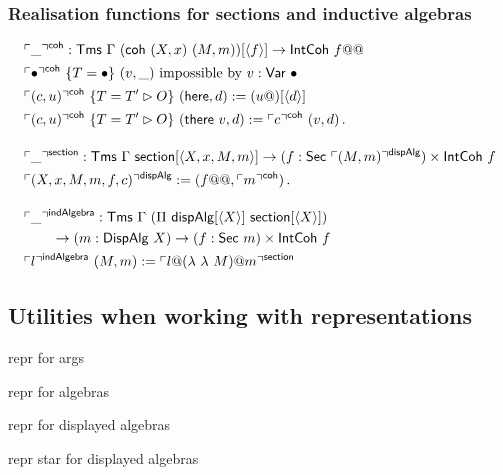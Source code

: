 \subsubsection{Realisation functions for sections and inductive algebras}

\begin{align*}
&\emb{\_}^{\mta{coh}} : \Tms\ \Gamma \ (\mta{coh}\ (X, x)\ (M, m))[\Msub f] \to \mta{IntCoh}\ f@@ \\
&\emb{\bullet}^{\mta{coh}}\ \{T = \bullet\}\ (v, \_)\text{ impossible by $v : \mta{Var}\ \bullet$} \\
&\emb{(c, u)}^{\mta{coh}}\ \{T = T' \rhd O\}\ (\mta{here}, d) := (u@)[\Msub{d}] \\
&\emb{(c, u)}^{\mta{coh}}\ \{T = T' \rhd O\}\ (\mta{there}\ v, d) := \emb{c}^{\mta{coh}}\ (v, d) \,. \\[1em]
&\emb{\_}^{\mta{section}} : \Tms\ \Gamma \ \mta{section}[\Msub{X, x, M, m}] \to (f : \mta{Sec}\ \emb{(M, m)}^{\mta{dispAlg}}) \times \mta{IntCoh}\ f \\
&\emb{(X, x, M, m, f, c)}^{\mta{dispAlg}} := (f@@, \emb{m}^{\mta{coh}}) \,. \\[1em]
&\emb{\_}^\mta{indAlgebra} : \mta{Tms}\ \Gamma\ (\Pi\ \mta{dispAlg}[\Msub X]\ \mta{section}[\Msub X]) \\ & \qquad \to (m : \mta{DispAlg}\ X) \to (f : \mta{Sec}\ m) \times  \mta{IntCoh}\ f \\
&\emb{l}^\mta{indAlgebra}\ (M, m) := \emb{l@(\lambda\ \lambda\ M)@m}^\mta{section}
\end{align*}

\subsection{Utilities when working with representations} \label{app:reprs}

repr for args

repr for algebras

repr for displayed algebras

repr star for displayed algebras




